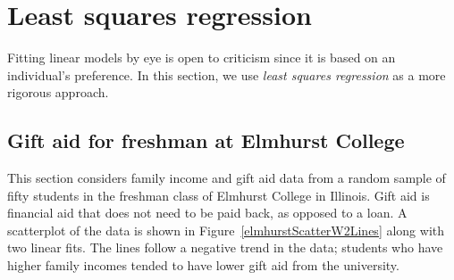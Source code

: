 {}







\section{Least squares regression}
\label{fittingALineByLSR}


Fitting linear models by eye is open to criticism since
it is based on an individual's preference.
In this section, we use \emph{least squares regression}
as a more rigorous approach.


\subsection{Gift aid for freshman at Elmhurst College}

This section considers family income and gift aid data from
a random sample of fifty students in the freshman class of
Elmhurst College in Illinois.
Gift aid is financial aid that does not need to be paid back,
as opposed to a loan.
A scatterplot of the data is shown in
Figure~\ref{elmhurstScatterW2Lines}
along with two linear fits.
The lines follow a negative trend in the data;
students who have higher family incomes tended to have lower
gift aid from the university.

